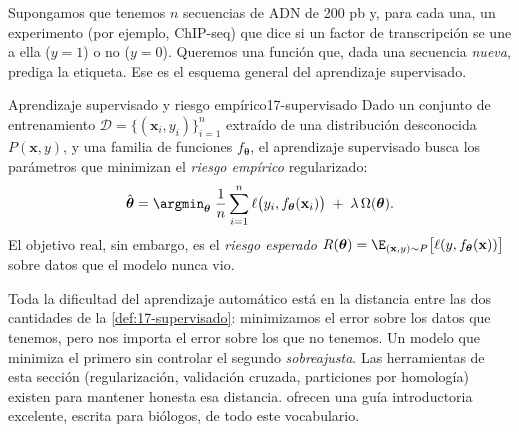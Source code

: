 Supongamos que tenemos $n$ secuencias de ADN de 200 pb y, para cada una, un experimento (por ejemplo, ChIP-seq) que dice si un factor de transcripción se une a ella ($y=1$) o no ($y=0$). Queremos una función que, dada una secuencia \emph{nueva}, prediga la etiqueta. Ese es el esquema general del aprendizaje supervisado.

\begin{definicion}{Aprendizaje supervisado y riesgo empírico}{17-supervisado}
Dado un conjunto de entrenamiento $\mathcal{D}=\{(\mathbf{x}_i,y_i)\}_{i=1}^{n}$ extraído de una distribución desconocida $P(\mathbf{x},y)$, y una familia de funciones $f_{\boldsymbol\theta}$, el aprendizaje supervisado busca los parámetros que minimizan el \emph{riesgo empírico} regularizado:
\begin{equation}\label{eq:17-riesgo}
\hat{\boldsymbol\theta} = \argmin_{\boldsymbol\theta}\; \frac{1}{n}\sum_{i=1}^{n} \ell\big(y_i, f_{\boldsymbol\theta}(\mathbf{x}_i)\big) \;+\; \lambda\, \Omega(\boldsymbol\theta).
\end{equation}
El objetivo real, sin embargo, es el \emph{riesgo esperado} $R(\boldsymbol\theta)=\E_{(\mathbf{x},y)\sim P}\big[\ell(y,f_{\boldsymbol\theta}(\mathbf{x}))\big]$ sobre datos que el modelo nunca vio.
\end{definicion}

\begin{simbolos}
\end{simbolos}

Toda la dificultad del aprendizaje automático está en la distancia entre las dos cantidades de la \cref{def:17-supervisado}: minimizamos el error sobre los datos que tenemos, pero nos importa el error sobre los que no tenemos. Un modelo que minimiza el primero sin controlar el segundo \emph{sobreajusta}. Las herramientas de esta sección (regularización, validación cruzada, particiones por homología) existen para mantener honesta esa distancia. \textcite{c17-greener2022} ofrecen una guía introductoria excelente, escrita para biólogos, de todo este vocabulario.

